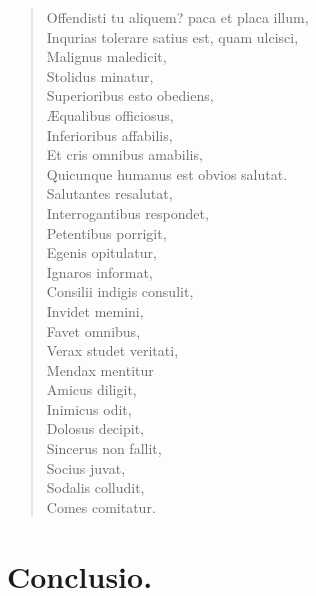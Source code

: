 \documentclass[12pt,  postvopaper]{memoir}
\begin{document}
\begin{verse}
  Offendisti tu aliquem? paca et placa illum,\\
  Inqurias tolerare satius est, quam ulcisci,\\
  Malignus maledicit,\\
  Stolidus minatur,\\
  Superioribus esto obediens,\\
  Æqualibus officiosus,\\
  Inferioribus affabilis,\\
  Et cris omnibus amabilis,\\
  Quicunque humanus est obvios salutat.\\
  Salutantes resalutat,\\
  Interrogantibus respondet,\\
  Petentibus porrigit,\\
  Egenis opitulatur,\\
  Ignaros informat,\\
  Consilii indigis consulit,\\
  Invidet memini,\\
  Favet omnibus,\\
  Verax studet veritati,\\
  Mendax mentitur\\
  Amicus diligit,\\
  Inimicus odit,\\
  Dolosus decipit,\\
  Sincerus non fallit,\\
  Socius juvat,\\
  Sodalis colludit,\\
  Comes comitatur.\\
\end{verse}


\chapter{Conclusio.}
\end{document}
